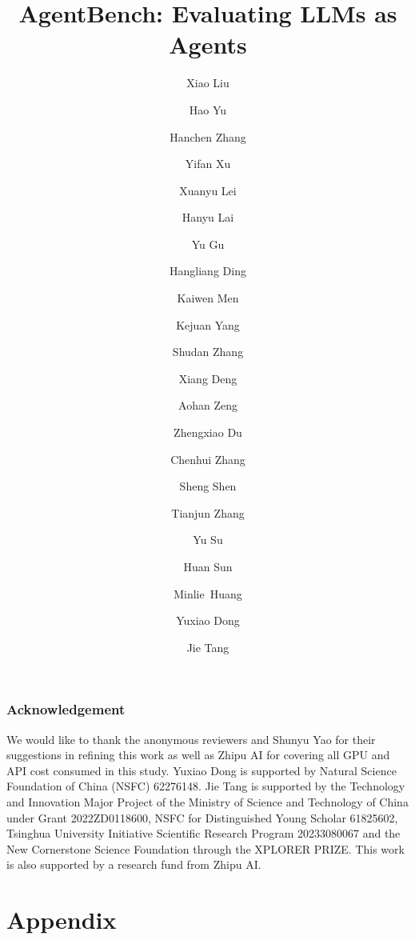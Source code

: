 \documentclass[table]{article} %
\title{AgentBench: Evaluating LLMs as Agents}
\author[1,*]{{Xiao Liu}}
\author[1,*,$\dagger$]{{Hao Yu}}
\author[1,*]{{Hanchen Zhang}}
\author[1]{{Yifan Xu}}
\author[1]{{Xuanyu Lei}}
\author[1]{{Hanyu Lai}}
\author[2,$\dagger$]{{Yu Gu}}
\author[1]{{Hangliang Ding}}
\author[1]{{Kaiwen Men}}
\author[1]{{Kejuan Yang}}
\author[1]{{Shudan Zhang}}
\author[2]{{Xiang Deng}}
\author[1]{{Aohan Zeng}}
\author[1]{{Zhengxiao Du}}
\author[1]{{Chenhui Zhang}}
\author[3]{{Sheng Shen}}
\author[3]{{Tianjun Zhang}}
\author[2]{{Yu Su}}
\author[2]{{Huan Sun}}
\author[1]{{Minlie~Huang}}
\author[1,$\ddagger$]{{Yuxiao Dong}}
\author[1,$\ddagger$]{{Jie Tang}}
\affil[1]{Tsinghua University}
\affil[2]{The Ohio State University}
\affil[3]{UC Berkeley}
\begin{document}
\doparttoc
\faketableofcontents

\maketitle
\vspace{-8mm}

\renewcommand{\thefootnote}{\fnsymbol{footnote}}
\renewcommand{\thefootnote}{\arabic{footnote}}


\begin{abstract}

\end{abstract}








\section*{Acknowledgement}
We would like to thank the anonymous reviewers and Shunyu Yao for their suggestions in refining this work as well as Zhipu AI for covering all GPU and API cost consumed in this study.
Yuxiao Dong is supported by Natural Science Foundation of China (NSFC) 62276148. 
Jie Tang is supported by the Technology and Innovation Major Project of the Ministry of Science and Technology of China under Grant 2022ZD0118600, NSFC for Distinguished Young Scholar 61825602, Tsinghua University Initiative Scientific Research Program 20233080067 and the New Cornerstone Science Foundation through the XPLORER PRIZE. 
This work is also supported by a research fund from Zhipu AI. 



\clearpage

\part{Appendix} %
\parttoc %

\end{document}
